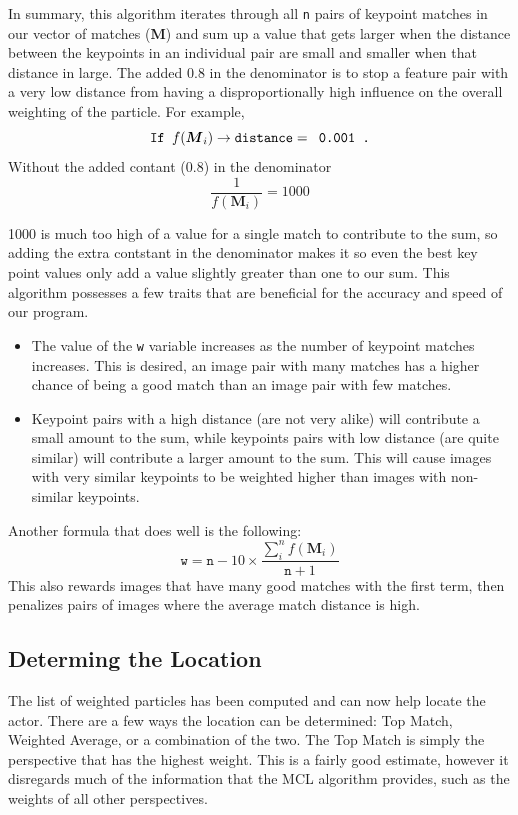 \documentclass[a4paper,11pt]{article}
\begin{document}
In summary, this algorithm iterates through all \texttt{n} pairs of keypoint matches in our vector of matches (\textbf{M}) and sum up a value that gets larger when the distance between the keypoints in an individual pair are small and smaller when that distance in large. The added 0.8 in the denominator is to stop a feature pair with a very low distance from having a disproportionally high influence on the overall weighting of the particle. For example,
\[ \verb.If . f(\boldsymbol{M}_i) \to \mathtt{distance} = \verb, 0.001 ., \]
Without the added contant (0.8) in the denominator
\[ \frac 1{f(\boldsymbol{M}_i)} = 1000\]

1000 is much too high of a value for a single match to contribute to the sum, so adding the extra contstant in the denominator makes it so even the best key point values only add a value slightly greater than one to our sum. This algorithm possesses a few traits that are beneficial for the accuracy and speed of our program.
\begin{itemize}
  \item The value of the \texttt{w} variable increases as the number of keypoint matches increases. This is desired, an image pair with many matches has a higher chance of being a good match than an image pair with few matches.
  \item Keypoint pairs with a high distance (are not very alike) will contribute a small amount to the sum, while keypoints pairs with low distance (are quite similar) will contribute a larger amount to the sum. This will cause images with very similar keypoints to be weighted higher than images with non-similar keypoints.
\end{itemize}

Another formula that does well is the following:
\[
\mathtt{w} = \mathtt{n} - 10 \times \frac{\sum_{i}^{n} f(\boldsymbol{M}_i)}{\mathtt{n} + 1}
\]
This also rewards images that have many good matches with the first term, then penalizes pairs of images where the average match distance is high.

\subsection{Determing the Location}
The list of weighted particles has been computed and can now help locate the actor. There are a few ways the location can be determined: Top Match, Weighted Average, or a combination of the two. The Top Match is simply the perspective that has the highest weight. This is a fairly good estimate, however it disregards much of the information that the MCL algorithm provides, such as the weights of all other perspectives. 
\end{document}
